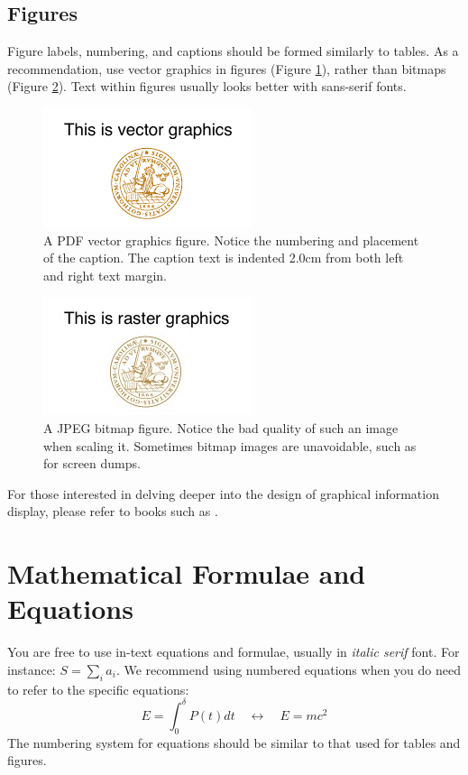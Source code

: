 \documentclass{cslthse-msc}
\begin{document}
\subsection{Figures}
Figure labels, numbering, and captions should be formed similarly to tables. As a recommendation, use vector graphics in figures (Figure \ref{fig:vectorg}), rather than bitmaps (Figure \ref{fig:rasterg}). Text within figures usually looks better with sans-serif fonts.
\begin{figure}[!hbt]
\centering
\includegraphics[scale=2.5]{examplepic1.pdf} 
\caption{A PDF vector graphics figure. Notice the numbering and placement of the caption. The caption text is indented 2.0cm from both left and right text margin.}\label{fig:vectorg}
\end{figure}

\begin{figure}[!hbt]
\centering
\includegraphics[scale=2.5]{examplepic3.jpg} 
\caption{A JPEG bitmap figure. Notice the bad quality of such an image when scaling it. Sometimes bitmap images are unavoidable, such as for screen dumps.}\label{fig:rasterg}
\end{figure}
For those interested in delving deeper into the design of graphical information display, please refer to books such as \cite{Tufte:1986, few2012show}.

\section{Mathematical Formulae and Equations}
You are free to use in-text equations and formulae, usually in \textit{italic serif} font. For instance: $S = \sum_i a_i$. We recommend using numbered equations when you do need to refer to the specific equations:
\begin{equation}
E = \int_0^{\delta} P(t) dt \quad \longleftrightarrow \quad E = m c^2
\end{equation}
The numbering system for equations should be similar to that used for tables and figures.
\end{document}
